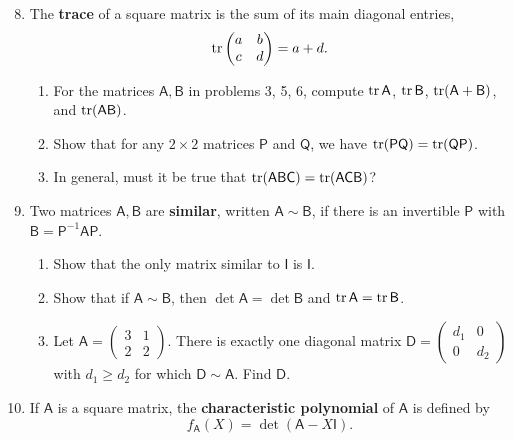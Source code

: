 \begin{enumerate}\setcounter{enumi}{7}
\item The \textbf{trace} of a square matrix is the sum of its main diagonal entries,
\begin{equation*}
\operatorname{tr}\begin{pmatrix} a & b \\ c & d \end{pmatrix} = a + d.
\end{equation*}
\begin{enumerate}
\item For the matrices $\mathsf{A},\mathsf{B}$ in problems 3, 5, 6, compute $\operatorname{tr}\mathsf{A}$, $\operatorname{tr}\mathsf{B}$, $\operatorname{tr}(\mathsf{A} + \mathsf{B})$, and $\operatorname{tr}(\mathsf{AB})$.
\item Show that for any $2\times 2$ matrices $\mathsf{P}$ and $\mathsf{Q}$, we have $\operatorname{tr}(\mathsf{PQ}) = \operatorname{tr}(\mathsf{QP})$.
\item In general, must it be true that $\operatorname{tr}(\mathsf{ABC}) = \operatorname{tr}(\mathsf{ACB})$?
\end{enumerate}
\item Two matrices $\mathsf{A},\mathsf{B}$ are \textbf{similar}, written $\mathsf{A}\sim\mathsf{B}$, if there is an invertible $\mathsf{P}$ with $\mathsf{B} = \mathsf{P}^{-1}\mathsf{AP}$.
\begin{enumerate}
\item Show that the only matrix similar to $\mathsf{I}$ is $\mathsf{I}$.
\item Show that if $\mathsf{A}\sim\mathsf{B}$, then $\det\mathsf{A} = \det\mathsf{B}$ and $\operatorname{tr}\mathsf{A} = \operatorname{tr}\mathsf{B}$.
\item Let $\mathsf{A} = \begin{pmatrix} 3 & 1 \\ 2 & 2 \end{pmatrix}$. There is exactly one diagonal matrix $\mathsf{D} = \begin{pmatrix} d_1 & 0 \\ 0 & d_2 \end{pmatrix}$ with $d_1\geq d_2$ for which $\mathsf{D}\sim\mathsf{A}$. Find $\mathsf{D}$.
\end{enumerate}
\item If $\mathsf{A}$ is a square matrix, the \textbf{characteristic polynomial} of $\mathsf{A}$ is defined by
\begin{equation*}
f_{\mathsf{A}}(X) = \det(\mathsf{A} - X\mathsf{I}).
\end{equation*}
\begin{enumerate}

\end{enumerate}
\end{enumerate}
